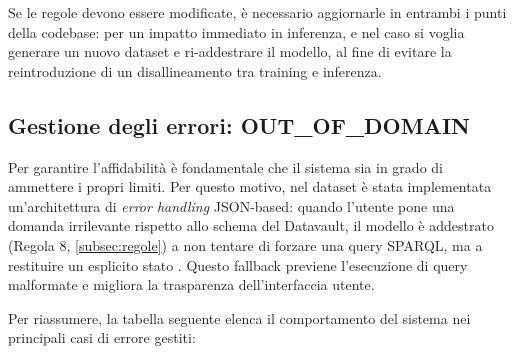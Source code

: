 Se le regole devono essere modificate, è necessario aggiornarle in entrambi i punti della codebase:  per un impatto immediato in inferenza, e  nel caso si voglia generare un nuovo dataset e ri-addestrare il modello, al fine di evitare la reintroduzione di un disallineamento tra training e inferenza.

\subsection{Gestione degli errori: OUT\_OF\_DOMAIN}\label{subsec:errori}

Per garantire l'affidabilità è fondamentale che il sistema sia in grado di ammettere i propri limiti. Per questo motivo, nel dataset è stata implementata un'architettura di \textit{error handling} JSON-based: quando l'utente pone una domanda irrilevante rispetto allo schema del Datavault, il modello è addestrato (Regola 8, \cref{subsec:regole}) a non tentare di forzare una query SPARQL, ma a restituire un esplicito stato . Questo fallback previene l'esecuzione di query malformate e migliora la trasparenza dell'interfaccia utente.

Per riassumere, la tabella seguente elenca il comportamento del sistema nei principali casi di errore gestiti:

